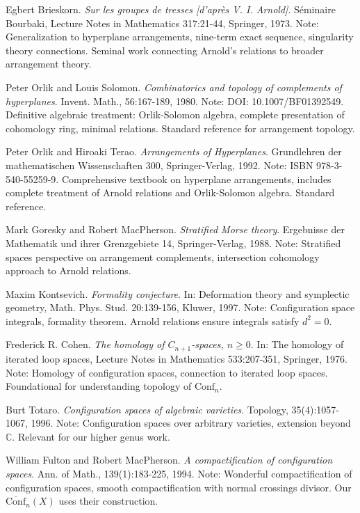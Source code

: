 \begin{thebibliography}{99}
Egbert Brieskorn.
\textit{Sur les groupes de tresses [d'après V. I. Arnold]}.
Séminaire Bourbaki, Lecture Notes in Mathematics 317:21-44, Springer, 1973.
Note: Generalization to hyperplane arrangements, nine-term exact sequence, 
singularity theory connections. Seminal work connecting Arnold's relations 
to broader arrangement theory.

Peter Orlik and Louis Solomon.
\textit{Combinatorics and topology of complements of hyperplanes}.
Invent. Math., 56:167-189, 1980.
Note: DOI: 10.1007/BF01392549. Definitive algebraic treatment: Orlik-Solomon algebra, 
complete presentation of cohomology ring, minimal relations. Standard reference for arrangement topology.

Peter Orlik and Hiroaki Terao.
\textit{Arrangements of Hyperplanes}.
Grundlehren der mathematischen Wissenschaften 300, Springer-Verlag, 1992.
Note: ISBN 978-3-540-55259-9. Comprehensive textbook on hyperplane arrangements, 
includes complete treatment of Arnold relations and Orlik-Solomon algebra. Standard reference.

Mark Goresky and Robert MacPherson.
\textit{Stratified Morse theory}.
Ergebnisse der Mathematik und ihrer Grenzgebiete 14, Springer-Verlag, 1988.
Note: Stratified spaces perspective on arrangement complements, 
intersection cohomology approach to Arnold relations.

Maxim Kontsevich.
\textit{Formality conjecture}.
In: Deformation theory and symplectic geometry, Math. Phys. Stud. 20:139-156, Kluwer, 1997.
Note: Configuration space integrals, formality theorem. 
Arnold relations ensure integrals satisfy $d^2 = 0$.

Frederick R. Cohen.
\textit{The homology of $C_{n+1}$-spaces, $n \geq 0$}.
In: The homology of iterated loop spaces, Lecture Notes in Mathematics 533:207-351, Springer, 1976.
Note: Homology of configuration spaces, connection to iterated loop spaces. 
Foundational for understanding topology of $\text{Conf}_n$.

Burt Totaro.
\textit{Configuration spaces of algebraic varieties}.
Topology, 35(4):1057-1067, 1996.
Note: Configuration spaces over arbitrary varieties, 
extension beyond $\mathbb{C}$. Relevant for our higher genus work.

William Fulton and Robert MacPherson.
\textit{A compactification of configuration spaces}.
Ann. of Math., 139(1):183-225, 1994.
Note: Wonderful compactification of configuration spaces, 
smooth compactification with normal crossings divisor. 
Our $\overline{\text{Conf}}_n(X)$ uses their construction.


\end{thebibliography}
